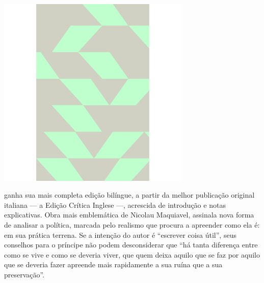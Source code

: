 \hspace*{-.4cm}\begin{minipage}[c]{.5\linewidth}
\small{
{}}
\end{minipage}


\pagebreak

\hspace{.5cm}

\begin{center}
\hspace*{.5cm}\includegraphics[width=92mm]{./grid/maquiavel.jpg}
\end{center}

\hspace*{-7cm}\hrulefill\hspace*{-7cm}

\medskip

 ganha sua mais completa edição bilíngue, a partir da melhor publicação original italiana --- a Edição Crítica Inglese ---, acrescida de introdução e notas explicativas. Obra mais emblemática de Nicolau Maquiavel, {} assinala nova forma de analisar a política, marcada pelo realismo que procura a apreender como ela é: em sua prática terrena. Se a intenção do autor é “escrever coisa útil”, seus conselhos para o príncipe não podem desconsiderar que “há tanta diferença entre como se vive e como se deveria viver, que quem deixa aquilo que se faz por aquilo que se deveria fazer apreende mais rapidamente a sua ruína que a sua preservação”.

